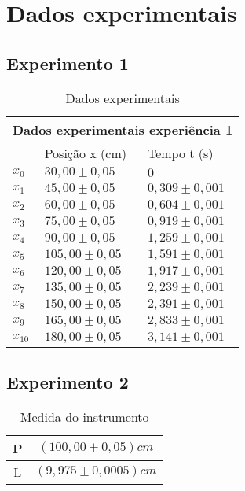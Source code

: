 \chapter{Dados experimentais}\label{cap:dados_experimentais}
\section{Experimento 1}

\begin{table}[h]
\centering
\begin{tabular}{ |m{1cm}|m{3cm}|m{3cm}|  } 
\hline
\multicolumn{3}{|c|}{Dados experimentais experiência 1} \\
\hline
 & Posição x (cm) & Tempo t (s) \\
\hline
$x_0$ & $30,00 \pm 0,05$ & $0$ \\
$x_1$ & $45,00 \pm 0,05$ & $0,309 \pm 0,001$ \\
$x_2$ & $60,00 \pm 0,05$ & $0,604 \pm 0,001$ \\
$x_3$ & $75,00 \pm 0,05$ & $0,919 \pm 0,001$ \\
$x_4$ & $90,00 \pm 0,05$ & $1,259 \pm 0,001$ \\
$x_5$ & $105,00 \pm 0,05$ & $1,591 \pm 0,001$   \\
$x_6$ & $120,00 \pm 0,05$ & $1,917 \pm 0,001$ \\
$x_7$ & $135,00 \pm 0,05$ & $2,239 \pm 0,001$ \\
$x_8$ & $150,00 \pm 0,05$ & $2,391 \pm 0,001$ \\
$x_9$ & $165,00 \pm 0,05$ & $2,833 \pm 0,001$ \\
$x_{10}$ & $180,00 \pm 0,05$ & $3,141 \pm 0,001$ \\
\hline
\end{tabular}
\caption{Dados experimentais}
\label{table:experimento1}
\end{table}

\section{Experimento 2}

\begin{table}[h]
    \centering
    \begin{tabular}{|c|c|}
        \hline
        P & $\left(100,00 \pm 0,05\right)cm$ \\
        \hline 
        L & $\left(9,975 \pm 0,0005\right)cm$ \\
        \hline
    \end{tabular}
    \caption{Medida do instrumento}
    \label{tab:instrumentos}
\end{table}

